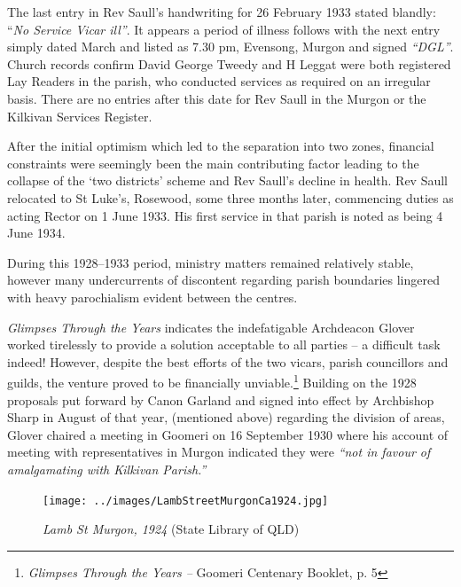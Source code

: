 The last entry in Rev Saull's handwriting for 26 February 1933 stated blandly: ``\emph{No Service Vicar ill''}. It appears a period of illness follows with the next entry simply dated March and listed as 7.30 pm, Evensong, Murgon and signed \emph{``DGL''}. Church records confirm David George Tweedy and H Leggat were both registered Lay Readers in the parish, who conducted services as required on an irregular basis. There are no entries after this date for Rev Saull in the Murgon or the Kilkivan Services Register.



After the initial optimism which led to the separation into two zones, financial constraints were seemingly been the main contributing factor leading to the collapse of the `two districts' scheme and Rev Saull's decline in health. Rev Saull relocated to St Luke's, Rosewood, some three months later, commencing duties as acting Rector on 1 June 1933. His first service in that parish is noted as being 4 June 1934.



During this 1928--1933 period, ministry matters remained relatively stable, however many undercurrents of discontent regarding parish boundaries lingered with heavy parochialism evident between the centres.



\emph{Glimpses Through the Years} indicates the indefatigable Archdeacon Glover worked tirelessly to provide a solution acceptable to all parties -- a difficult task indeed! However, despite the best efforts of the two vicars, parish councillors and guilds, the venture proved to be financially unviable.\footnote{\emph{Glimpses Through the Years --} Goomeri Centenary Booklet, p. 5} Building on the 1928 proposals put forward by Canon Garland and signed into effect by Archbishop Sharp in August of that year, (mentioned above) regarding the division of areas, Glover chaired a meeting in Goomeri on 16 September 1930 where his account of meeting with representatives in Murgon indicated they were \emph{``not in favour of amalgamating with Kilkivan Parish.''}








\begin{figure}[htb]
\begin{center}
\texttt{[image: ../images/LambStreetMurgonCa1924.jpg]}
\caption{{\itshape Lamb St Murgon, 1924} {\scriptsize(State Library of QLD)}}
\end{center}
\end{figure}


